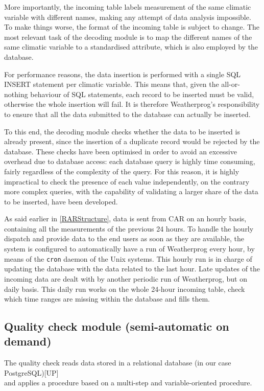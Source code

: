 \documentclass[authoryear,preprint,review,12pt]{elsarticle}
\begin{document}
 More importantly, the incoming table labels measurement of the same climatic variable with different names, making any attempt of data analysis impossible. To make things worse, the format of the incoming table is subject to change. The most relevant task of the decoding module is to map the different names of the same climatic variable to a standardised attribute, which is also employed by the database.
 
 For performance reasons, the data insertion is performed with a single SQL INSERT statement per climatic variable. This means that, given the all-or-nothing behaviour of SQL statements, each record to be inserted must be valid, otherwise the whole insertion will fail. It is therefore Weatherprog's responsibility to ensure that all the data submitted to the database can actually be inserted.
 
 To this end, the decoding module checks whether the data to be inserted is already present, since the insertion of a duplicate record would be rejected by the database. These checks have been optimised in order to avoid an excessive overhead due to database access: each database query is highly time consuming, fairly regardless of the complexity of the query. For this reason, it is highly impractical to check the presence of each value independently, on the contrary more complex queries, with the capability of validating a larger share of the data to be inserted, have been developed.
 
As said earlier in \cref{RARStructure}, data is sent from CAR on an hourly basis,  containing all the measurements of the previous 24 hours. To handle the hourly dispatch and provide data to the end users as soon as they are available, the system is configured to automatically have a run of Weatherprog every hour, by means of the \texttt{cron} daemon of the Unix systems. This hourly run is in charge of updating the database with the data related to the last hour. Late updates of the incoming data are dealt with by another periodic run of Weatherprog, but on daily basis. This daily run works on the whole 24-hour incoming table, check which time ranges are missing within the database and fills them.

\subsection{Quality check module (semi-automatic on demand)}
The quality check reads data stored in a relational database (in our case PostgreSQL)[UP]\\
and applies a procedure based on a multi-step and variable-oriented procedure.
\end{document}
